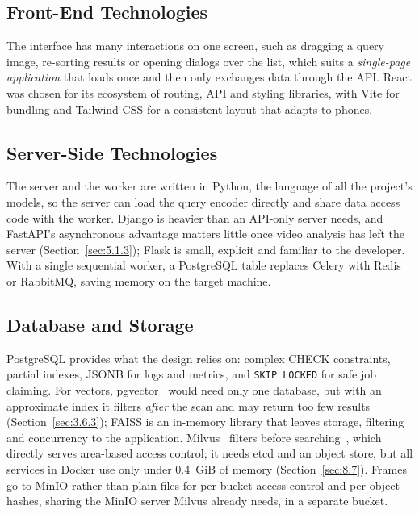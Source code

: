 \subsection{Front-End Technologies}
\label{sec:6.1.1}

The interface has many interactions on one screen, such as dragging a query image, re-sorting results or opening dialogs over the list, which suits a \emph{single-page application} that loads once and then only exchanges data through the API. React was chosen for its ecosystem of routing, API and styling libraries, with Vite for bundling and Tailwind CSS for a consistent layout that adapts to phones.

\subsection{Server-Side Technologies}
\label{sec:6.1.2}

The server and the worker are written in Python, the language of all the project's models, so the server can load the query encoder directly and share data access code with the worker. Django is heavier than an API-only server needs, and FastAPI's asynchronous advantage matters little once video analysis has left the server (Section~\ref{sec:5.1.3}); Flask is small, explicit and familiar to the developer. With a single sequential worker, a PostgreSQL table replaces Celery with Redis or RabbitMQ, saving memory on the target machine.

\subsection{Database and Storage}
\label{sec:6.1.3}

PostgreSQL provides what the design relies on: complex CHECK constraints, partial indexes, JSONB for logs and metrics, and \texttt{SKIP LOCKED} for safe job claiming. For vectors, pgvector~\cite{pgvector2026} would need only one database, but with an approximate index it filters \emph{after} the scan and may return too few results (Section~\ref{sec:3.6.3}); FAISS is an in-memory library that leaves storage, filtering and concurrency to the application. Milvus~\cite{wang2021milvus} filters before searching~\cite{milvus2026filtered}, which directly serves area-based access control; it needs etcd and an object store, but all services in Docker use only under 0.4~GiB of memory (Section~\ref{sec:8.7}). Frames go to MinIO rather than plain files for per-bucket access control and per-object hashes, sharing the MinIO server Milvus already needs, in a separate bucket.


